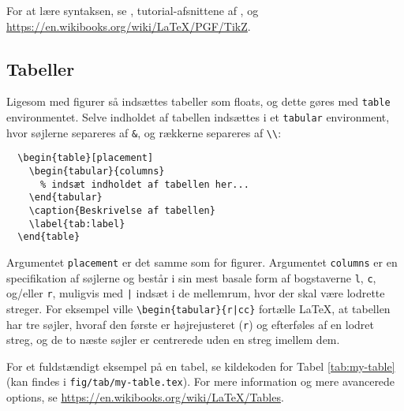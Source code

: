 

For at lære syntaksen, se \citep{minimaltikz}, tutorial-afsnittene af \citep{tikzmanual}, og \url{https://en.wikibooks.org/wiki/LaTeX/PGF/TikZ}.


\subsection{Tabeller}
\label{sec:tables}

Ligesom med figurer så indsættes tabeller som floats, og dette gøres med \texttt{table} environmentet.
Selve indholdet af tabellen indsættes i et \texttt{tabular} environment, hvor søjlerne separeres af \verb!&!, og rækkerne separeres af \verb!\\!:

\begin{verbatim}
  \begin{table}[placement]
    \begin{tabular}{columns}
      % indsæt indholdet af tabellen her...
    \end{tabular}
    \caption{Beskrivelse af tabellen}
    \label{tab:label}
  \end{table}
\end{verbatim}

Argumentet \texttt{placement} er det samme som for figurer.
Argumentet \texttt{columns} er en specifikation af søjlerne og består i sin mest basale form af bogstaverne \texttt{l}, \texttt{c}, og/eller \texttt{r}, muligvis med \verb!|! indsæt i de mellemrum, hvor der skal være lodrette streger.
For eksempel ville \verb!\begin{tabular}{r|cc}! fortælle \LaTeX{}, at tabellen har tre søjler, hvoraf den første er højrejusteret (\texttt{r}) og efterføles af en lodret streg, og de to næste søjler er centrerede uden en streg imellem dem.

For et fuldstændigt eksempel på en tabel, se kildekoden for Tabel \ref{tab:my-table} (kan findes i \verb!fig/tab/my-table.tex!).
For mere information og mere avancerede options, se \url{https://en.wikibooks.org/wiki/LaTeX/Tables}.
